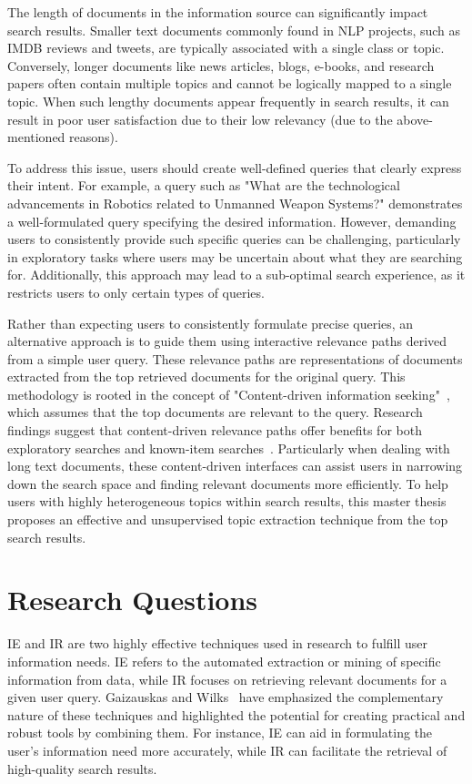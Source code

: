 The length of documents in the information source can significantly impact search results. Smaller text documents commonly found in \ac{NLP} projects, such as IMDB reviews and tweets, are typically associated with a single class or topic. Conversely, longer documents like news articles, blogs, e-books, and research papers often contain multiple topics and cannot be logically mapped to a single topic. When such lengthy documents appear frequently in search results, it can result in poor user satisfaction due to their low relevancy (due to the above-mentioned reasons).


To address this issue, users should create well-defined queries that clearly express their intent. For example, a query such as "What are the technological advancements in Robotics related to Unmanned Weapon Systems?" demonstrates a well-formulated query specifying the desired information. However, demanding users to consistently provide such specific queries can be challenging, particularly in exploratory tasks where users may be uncertain about what they are searching for. Additionally, this approach may lead to a sub-optimal search experience, as it restricts users to only certain types of queries.

Rather than expecting users to consistently formulate precise queries, an alternative approach is to guide them using interactive relevance paths derived from a simple user query. These relevance paths are representations of documents extracted from the top retrieved documents for the original query. This methodology is rooted in the concept of "Content-driven information seeking"~\cite{marchionini2007find}, which assumes that the top documents are relevant to the query. Research findings suggest that content-driven relevance paths offer benefits for both exploratory searches and known-item searches~\cite{marchionini2007find}. Particularly when dealing with long text documents, these content-driven interfaces can assist users in narrowing down the search space and finding relevant documents more efficiently. To help users with highly heterogeneous topics within search results, this master thesis proposes an effective and unsupervised topic extraction technique from the top search results.
 
\section{Research Questions}

\ac{IE} and \ac{IR} are two highly effective techniques used in research to fulfill user information needs. \ac{IE} refers to the automated extraction or mining of specific information from data, while IR focuses on retrieving relevant documents for a given user query. Gaizauskas and Wilks~\cite{gaizauskas1998information} have emphasized the complementary nature of these techniques and highlighted the potential for creating practical and robust tools by combining them. For instance, \ac{IE} can aid in formulating the user's information need more accurately, while IR can facilitate the retrieval of high-quality search results.
 
